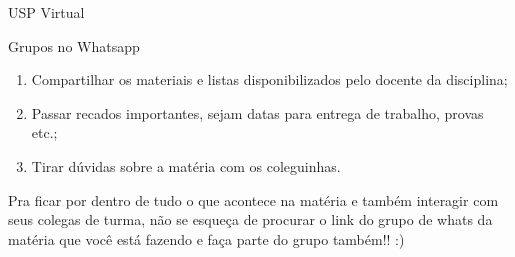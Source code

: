 \begin{secao}{USP Virtual}
\begin{subsecao}{Grupos no Whatsapp}
\begin{enumerate}
\item Compartilhar os materiais e listas disponibilizados pelo docente da disciplina;
\item Passar recados importantes, sejam datas para entrega de trabalho, provas etc.;
\item Tirar dúvidas sobre a matéria com os coleguinhas.
\end{enumerate}

Pra ficar por dentro de tudo o que acontece na matéria e também interagir com seus colegas
de turma, não se esqueça de procurar o link do grupo de whats da matéria que você está fazendo
e faça parte do grupo também!! :)

\end{subsecao}

\end{secao}
